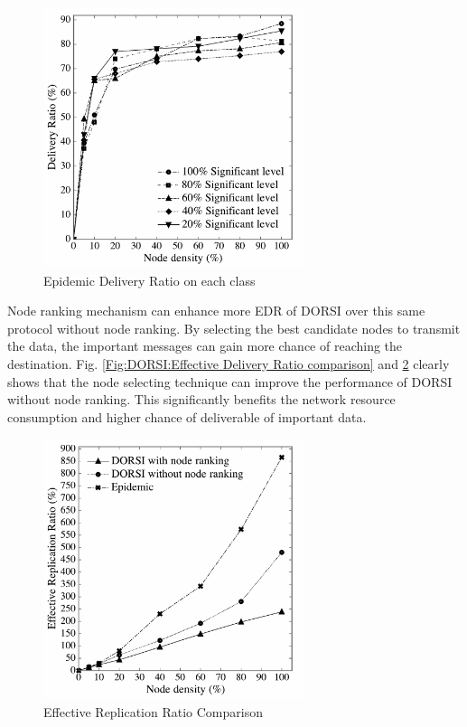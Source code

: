 \begin{figure}[!h]
\centering
\includegraphics[width=3in]{Graphs/EpidemicDeliveryRatiooneachclass.pdf}
\caption{Epidemic Delivery Ratio on each class}
\label{Fig:DORSI:Epidemic Delivery Ratio on each class}
\end{figure}

Node ranking mechanism can enhance more EDR of DORSI over this same protocol without node ranking. 
By selecting the best candidate nodes to transmit the data, the important messages can gain more chance of reaching the destination. 
Fig. \ref{Fig:DORSI:Effective Delivery Ratio comparison} and \ref{Fig:DORSI:Effective Replication Ration Comparison} clearly shows that the node selecting technique can improve the performance of DORSI without node ranking. 
This significantly benefits the network resource consumption and higher chance of deliverable of important data.

\begin{figure}[!h]
\centering
\includegraphics[width=3in]{Graphs/EffectiveReplicationRationComparison.pdf}
\caption{Effective Replication Ratio Comparison}
\label{Fig:DORSI:Effective Replication Ration Comparison}
\end{figure}

